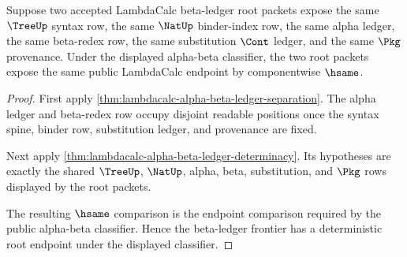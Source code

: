 \begin{theorem}
\label{thm:lambdacalc-root-beta-ledger-frontier}
Suppose two accepted LambdaCalc beta-ledger root packets expose the same
$\TreeUp$ syntax row, the same $\NatUp$ binder-index row, the same alpha ledger,
the same beta-redex row, the same substitution $\Cont$ ledger, and the same
$\Pkg$ provenance. Under the displayed alpha-beta classifier, the two root
packets expose the same public LambdaCalc endpoint by componentwise $\hsame$.
\end{theorem}
\begin{proof}
First apply \autoref{thm:lambdacalc-alpha-beta-ledger-separation}. The alpha
ledger and beta-redex row occupy disjoint readable positions once the syntax
spine, binder row, substitution ledger, and provenance are fixed.

Next apply \autoref{thm:lambdacalc-alpha-beta-ledger-determinacy}. Its
hypotheses are exactly the shared $\TreeUp$, $\NatUp$, alpha, beta,
substitution, and $\Pkg$ rows displayed by the root packets.

The resulting $\hsame$ comparison is the endpoint comparison required by the
public alpha-beta classifier. Hence the beta-ledger frontier has a deterministic
root endpoint under the displayed classifier.
\end{proof}

